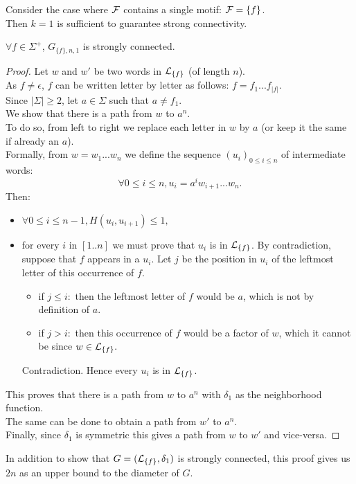 \documentclass{article}
\begin{document}
Consider the case where $\mathcal{F}$ contains a single motif: $\mathcal{F} = \{f\}$. \\
Then $k = 1$ is sufficient to guarantee strong connectivity.
\begin{result}
	$\forall f \in \Sigma^+$, $G_{\{f\}, n, 1}$ is strongly connected.
\end{result}
\begin{proof}
	Let $w$ and $w'$ be two words in $\mathcal{L}_{\{f\}}$ (of length $n$). \\
	As $f \neq \epsilon$, $f$ can be written letter by letter as follows: $f = f_1 ... f_{|f|}$. \\
	Since $|\Sigma| \geq 2$, let $a \in \Sigma$ such that $a \neq f_1$. \\
	We show that there is a path from $w$ to $a^n$. \\
	To do so, from left to right we replace each letter in $w$ by $a$ (or keep it the same if already an $a$). \\
	Formally, from $w = w_1 ... w_n$ we define the sequence $(u_i)_{0 \leq i \leq n}$ of intermediate words:
	$$ \forall 0 \leq i \leq n, u_i = a^i w_{i+1} ... w_n.$$
	Then:
	\begin{itemize}
		\item $\forall 0 \leq i \leq n - 1, H(u_i, u_{i+1}) \leq 1,$
		\item for every $i$ in $[1..n]$ we must prove that $u_i$ is in $\mathcal{L}_{\{f\}}$. By contradiction, suppose that $f$ appears in a $u_i$. Let $j$ be the position in $u_i$ of the leftmost letter of this occurrence of $f$.
		\begin{itemize}
			\item if $j \leq i:$ then the leftmost letter of $f$ would be $a$, which is not by definition of $a$.
			\item if $j > i:$ then this occurrence of $f$ would be a factor of $w$, which it cannot be since $w \in \mathcal{L}_{\{f\}}.$
		\end{itemize}
	Contradiction. Hence every $u_i$ is in $\mathcal{L}_{\{f\}}$.
	\end{itemize}
	This proves that there is a path from $w$ to $a^n$ with $\delta_1$ as the neighborhood function. \\
	The same can be done to obtain a path from $w'$ to $a^n$. \\
	Finally, since $\delta_1$ is symmetric this gives a path from $w$ to $w'$ and vice-versa.	
\end{proof}

In addition to show that $G = (\mathcal{L}_{\{f\}}, \delta_1)$ is strongly connected, this proof gives us $2n$ as an upper bound to the diameter of $G$.
\end{document}
